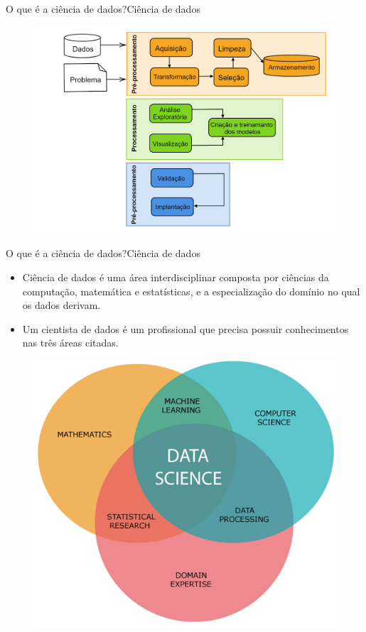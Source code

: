 \documentclass[t]{beamer}
\begin{document}
\begin{ftst}{O que é a ciência de dados?}{Ciência de dados}

\begin{figure}
    \centering
    \includegraphics[scale=0.15]{Figuras/slide00_07.png}
\end{figure}
\end{ftst}


\begin{ftst}{O que é a ciência de dados?}{Ciência de dados}
\small
\begin{itemize}
    \item Ciência de dados é uma área interdisciplinar composta por ciências da computação, matemática e estatísticas, e a especialização do domínio no qual os dados derivam.
    \item Um cientista de dados é um profissional que precisa possuir conhecimentos nas três áreas citadas.
\end{itemize}
\begin{figure}
    \centering
    \includegraphics[scale=0.28]{Figuras/slide00_08.png}
\end{figure}

\end{ftst}
\end{document}
